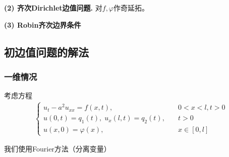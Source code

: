 \documentclass[11pt, a4paper]{article}
\theoremstyle{theorem}
\begin{document}
\textbf{(2) 齐次Dirichlet边值问题.} 对$f,\varphi$作奇延拓。

\textbf{(3) Robin齐次边界条件}

\subsection{初边值问题的解法}

\subsubsection{一维情况}

考虑方程
\begin{align}
    \label{Q4-6-1}
    \begin{cases}
      u_t - a^2 u_{xx} = f(x,t), \quad &0 < x < l, t > 0 \\
      u(0,t) = q_1(t), \; u_x(l,t) = q_2(t), \quad &t > 0 \\
      u(x,0) = \varphi(x), \quad &x \in [0,l]
    \end{cases}
\end{align}

我们使用Fourier方法（分离变量）
\end{document}
